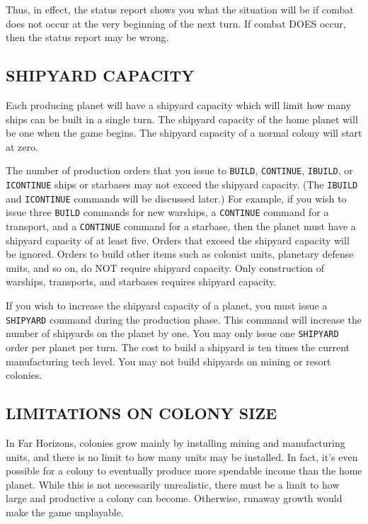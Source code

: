 \documentclass[10pt,titlepage]{article}
\begin{document}
Thus, in effect, the status report shows you what the situation will be if
combat does not occur at the very beginning of the next turn.  If combat DOES
occur, then the status report may be wrong.


\subsection{SHIPYARD CAPACITY}
\label{sec:shipyardcapacity}


Each producing planet will have a shipyard capacity which will limit how many
ships can be built in a single turn.  The shipyard capacity of the home planet
will be one when the game begins.  The shipyard capacity of a normal colony
will start at zero.

The number of production orders that you issue to \texttt{BUILD}, \texttt{CONTINUE}, \texttt{IBUILD}, or
\texttt{ICONTINUE} ships or starbases may not exceed the shipyard capacity.  (The \texttt{IBUILD}
and \texttt{ICONTINUE} commands will be discussed later.)  For example, if you wish
to issue three \texttt{BUILD} commands for new warships, a \texttt{CONTINUE} command for a
transport, and a \texttt{CONTINUE} command for a starbase, then the planet must have a
shipyard capacity of at least five.  Orders that exceed the shipyard capacity
will be ignored.  Orders to build other items such as colonist units, planetary
defense units, and so on, do NOT require shipyard capacity.  Only construction
of warships, transports, and starbases requires shipyard capacity.

If you wish to increase the shipyard capacity of a planet, you must issue a
\texttt{SHIPYARD} command during the production phase.  This command will increase the
number of shipyards on the planet by one.  You may only issue one \texttt{SHIPYARD}
order per planet per turn.  The cost to build a shipyard is ten times the
current manufacturing tech level.  You may not build shipyards on mining or
resort colonies.


\subsection{LIMITATIONS ON COLONY SIZE}
\label{sec:limitsoncolonysize}


In Far Horizons, colonies grow mainly by installing mining and manufacturing
units, and there is no limit to how many units may be installed.  In fact, it's
even possible for a colony to eventually produce more spendable income than the
home planet.  While this is not necessarily unrealistic, there must be a limit
to how large and productive a colony can become.  Otherwise, runaway growth
would make the game unplayable.
\end{document}
